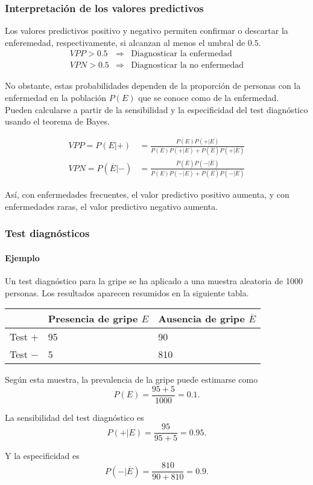 \begin{frame}
\frametitle{Interpretación de los valores predictivos}
Los valores predictivos positivo y negativo permiten confirmar o descartar la enferemedad, respectivamente, si alcanzan al menos el umbral de $0.5$.
\[
	\begin{array}{rcl}
	VPP>0.5 & \Rightarrow & \mbox{Diagnosticar la enfermedad}\\
	VPN>0.5 & \Rightarrow & \mbox{Diagnosticar la no enfermedad} 
	\end{array}
\]
	
No obstante, estas probabilidades dependen de la proporción de personas con la enfermedad en la población $P(E)$ que se conoce como  de la enfermedad.
Pueden calcularse a partir de la sensibilidad y la especificidad del test diagnóstico usando el teorema de Bayes.
	
\begin{align*}
VPP=P(E|+) &= \frac{P(E)P(+|E)}{P(E)P(+|E)+P(\overline{E})P(+|\overline{E})}\\
VPN=P(\overline{E}|-) &= \frac{P(\overline{E})P(-|\overline{E})}{P(E)P(-|E)+P(\overline{E})P(-|\overline{E})}
\end{align*} 
	
Así, con enfermedades frecuentes, el valor predictivo positivo aumenta, y con enfermedades raras, el valor predictivo negativo aumenta.
\end{frame}


\begin{frame}
\frametitle{Test diagnósticos}
\framesubtitle{Ejemplo}
Un test diagnóstico para la gripe se ha aplicado a una muestra aleatoria de 1000 personas.
Los resultados aparecen resumidos en la siguiente tabla.
\begin{center}
	\begin{tabular}{|m{2.5cm}|m{3.2cm}<{\centering}|m{3.2cm}<{\centering}|}
	\cline{2-3}
	\multicolumn{1}{c|}{} & Presencia de gripe $E$ & Ausencia de gripe $\overline E$\\ \hline
	Test $+$ & 95 & 90 \\
	\hline
	Test $-$ & 5 & 810 \\
	\hline
	\end{tabular}
\end{center}
	
Según esta muestra, la prevalencia de la gripe puede estimarse como
\[
	P(E) = \frac{95+5}{1000} = 0.1.
\] 
	
La sensibilidad del test diagnóstico es 
\[
	P(+|E) = \frac{95}{95+5}= 0.95. 
\] 
	
Y la especificidad es 
\[
	P(-|\overline{E}) = \frac{810}{90+810}=0.9.
\]
\end{frame}
	
